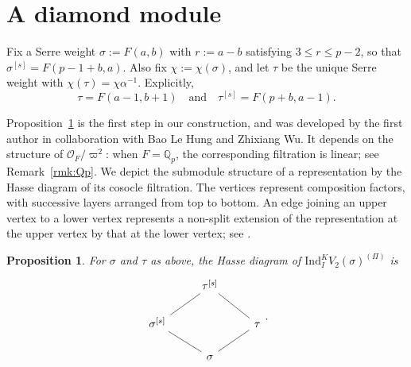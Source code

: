 \documentclass[a4paper,10pt,twoside]{amsart}
\newtheorem{proposition}[theorem]{Proposition}
\theoremstyle{definition}
\numberwithin{equation}{section}
\begin{document}
\section{A diamond module}\label{sec:diamond}

Fix a Serre weight \(\sigma:=F(a,b)\) with \(r:=a-b\) satisfying
\(3\leq r\leq p-2\), so that \(\sigma^{[s]}=F(p-1+b,a)\). Also fix
\(\chi:=\chi(\sigma)\), and let \(\tau\) be the unique Serre weight with
\(\chi(\tau)=\chi\alpha^{-1}\). Explicitly,
\[
\tau=F(a-1,b+1)
\quad \text{and}\quad
\tau^{[s]}=F(p+b,a-1).
\]

Proposition~\ref{diamond-prop} is the first step in our construction, and was developed by the first author in collaboration with Bao Le Hung and Zhixiang Wu. 
It depends on the structure of \(\mathcal O_F/\varpi^2\): when \(F=\mathbb Q_p\), the corresponding filtration is linear; see Remark~\ref{rmk:Qp}. We depict the submodule structure of a representation by the Hasse diagram of its cosocle filtration. The vertices represent composition factors, with successive layers arranged from top to bottom. An edge joining an upper vertex to a lower vertex represents
a non-split extension of the representation at the upper vertex by that at the lower vertex; see \cite{Alp80}.

\begin{proposition}\label{diamond-prop}
For $\sigma$ and $\tau$ as above, the Hasse diagram of $\mathrm{Ind}_I^K V_2(\sigma)^{(\Pi)}$
is
\[
\begin{tikzcd}
   & {\tau^{[s]}}& \\
    {\sigma^{[s]}} & {} & \tau \\
    & {\sigma}
    \arrow[no head, from=1-2, to=2-1]
    \arrow[no head, from=1-2, to=2-3]
    \arrow[no head, from=2-1, to=3-2]
    \arrow[no head, from=2-3, to=3-2]
\end{tikzcd}.
\]
\end{proposition}
\end{document}
